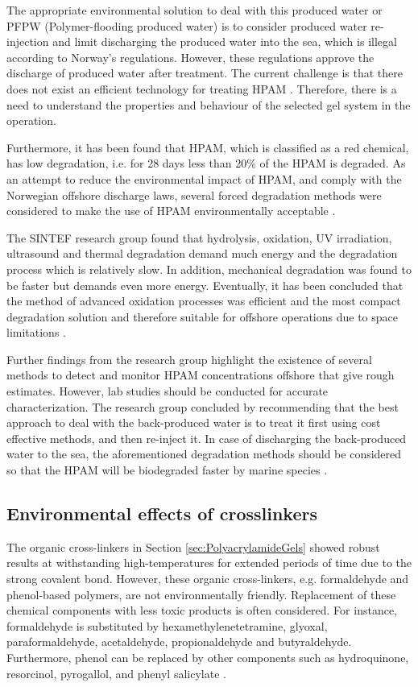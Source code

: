 The appropriate environmental solution to deal with this produced water or PFPW (Polymer-flooding produced water) is to consider produced water re-injection and limit discharging the produced water into the sea, which is illegal according to Norway’s regulations. However, these regulations approve the discharge of produced water after treatment. The current challenge is that there does not exist an efficient technology for treating HPAM \citep{Azrague2011}. Therefore, there is a need to understand the properties and behaviour of the selected gel system in the operation.

Furthermore, it has been found that HPAM, which is classified as a red chemical, has low degradation, i.e. for 28 days less than 20\% of the HPAM is degraded. As an attempt to reduce the environmental impact of HPAM, and comply with the Norwegian offshore discharge laws, several forced degradation methods were considered to make the use of HPAM environmentally acceptable \citep{Azrague2011}. 

The SINTEF research group found that hydrolysis, oxidation, UV irradiation, ultrasound and thermal degradation demand much energy and the degradation process which is relatively slow. In addition, mechanical degradation was found to be faster but demands even more energy. Eventually, it has been concluded that the method of advanced oxidation processes was efficient and the most compact degradation solution and therefore suitable for offshore operations due to space limitations \citep{Azrague2011}.

Further findings from the research group highlight the existence of several methods to detect and monitor HPAM concentrations offshore that give rough estimates. However, lab studies should be conducted for accurate characterization. The research group concluded by recommending that the best approach to deal with the back-produced water is to treat it first using cost effective methods, and then re-inject it. In case of discharging the back-produced water to the sea, the aforementioned degradation methods should be considered so that the HPAM will be biodegraded faster by marine species \citep{Azrague2011}.

\subsection{Environmental effects of crosslinkers}

 The organic cross-linkers in Section \ref{sec:PolyacrylamideGels} showed robust results at withstanding high-temperatures for extended periods of time due to the strong covalent bond. However, these organic cross-linkers, e.g. formaldehyde and phenol-based polymers, are not environmentally friendly. Replacement of these chemical components with less toxic products is often considered. For instance, formaldehyde is substituted by hexamethylenetetramine, glyoxal, paraformaldehyde, acetaldehyde, propionaldehyde and butyraldehyde. Furthermore, phenol can be replaced by other components such as hydroquinone, resorcinol, pyrogallol, and phenyl salicylate \citep{SinghYadav2013}.

